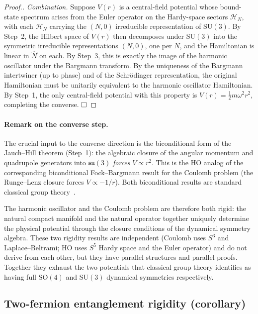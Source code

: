 \documentclass[twocolumn,pra,amsmath,amssymb,superscriptaddress]{revtex4-2}
\begin{document}
\begin{proof}[Proof.]
\emph{Combination.}  Suppose $V(r)$ is a central-field potential
whose bound-state spectrum arises from the Euler operator on the
Hardy-space sectors $\mathcal{H}_N$, with each $\mathcal{H}_N$
carrying the $(N, 0)$ irreducible representation of
$\mathrm{SU}(3)$.  By Step~2, the Hilbert space of $V(r)$ then
decomposes under $\mathrm{SU}(3)$ into the symmetric irreducible
representations $(N, 0)$, one per $N$, and the Hamiltonian is
linear in $\hat{N}$ on each.  By Step~3, this is exactly the
image of the harmonic oscillator under the Bargmann transform.
By the uniqueness of the Bargmann intertwiner (up to phase) and
of the Schr\"odinger representation, the original Hamiltonian
must be unitarily equivalent to the harmonic oscillator
Hamiltonian.  By Step~1, the only central-field potential with
this property is $V(r) = \frac{1}{2} m \omega^2 r^2$, completing
the converse.  $\hfill\square$
\end{proof}

\paragraph{Remark on the converse step.}
The crucial input to the converse direction is the biconditional
form of the Jauch--Hill theorem (Step~1): the algebraic closure
of the angular momentum and quadrupole generators into
$\mathfrak{su}(3)$ \emph{forces} $V \propto r^2$.  This is the
HO analog of the corresponding biconditional Fock--Bargmann
result for the Coulomb problem (the Runge--Lenz closure forces
$V \propto -1/r$).  Both biconditional results are standard
classical group theory~\cite{wybourne1974, iachello2006}.

The harmonic oscillator and the Coulomb problem are therefore
both rigid: the natural compact manifold and the natural
operator together uniquely determine the physical potential
through the closure conditions of the dynamical symmetry
algebra.  These two rigidity results are independent (Coulomb
uses $S^3$ and Laplace--Beltrami; HO uses $S^5$ Hardy space
and the Euler operator) and do not derive from each other, but
they have parallel structures and parallel proofs.  Together
they exhaust the two potentials that classical group theory
identifies as having full $\mathrm{SO}(4)$ and $\mathrm{SU}(3)$
dynamical symmetries respectively.

\subsection{Two-fermion entanglement rigidity (corollary)}
\label{sec:entanglement-rigidity}
\end{document}
